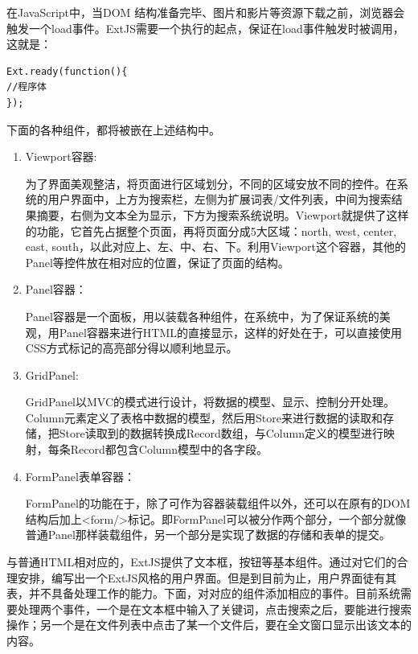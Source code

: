 \documentclass[12pt,a4paper]{article}
\begin{document}
	在{\Times JavaScript}中，当{\Times DOM} 结构准备完毕、图片和影片等资源下载之前，浏览器会触发一个{\Times load}事件。{\Times ExtJS}需要一个执行的起点，保证在{\Times load}事件触发时被调用，这就是：
\lstset{language=C,frame=lines,basicstyle=\Times, commentstyle=\SimSun,texcl=true}
\begin{lstlisting}
Ext.ready(function(){
//程序体
});
\end{lstlisting}	

	下面的各种组件，都将被嵌在上述结构中。
\begin{enumerate}[(1)]
\item
{\Times Viewport}容器:

	为了界面美观整洁，将页面进行区域划分，不同的区域安放不同的控件。在系统的用户界面中，上方为搜索栏，左侧为扩展词表/文件列表，中间为搜索结果摘要，右侧为文本全为显示，下方为搜索系统说明。{\Times Viewport}就提供了这样的功能，它首先占据整个页面，再将页面分成5大区域：{\Times north}, {\Times west}, {\Times center}, {\Times east}, {\Times south}，以此对应上、左、中、右、下。利用{\Times Viewport}这个容器，其他的{\Times Panel}等控件放在相对应的位置，保证了页面的结构。
	
\item
{\Times Panel}容器：

	{\Times Panel}容器是一个面板，用以装载各种组件，在系统中，为了保证系统的美观，用{\Times Panel}容器来进行{\Times HTML}的直接显示，这样的好处在于，可以直接使用{\Times CSS}方式标记的高亮部分得以顺利地显示。
	
\item 
{\Times GridPanel}:

	{\Times GridPanel}以{\Times MVC}的模式进行设计，将数据的模型、显示、控制分开处理。{\Times Column}元素定义了表格中数据的模型，然后用{\Times Store}来进行数据的读取和存储，把{\Times Store}读取到的数据转换成{\Times Record}数组，与{\Times Column}定义的模型进行映射，每条{\Times Record}都包含{\Times Column}模型中的各字段。

\item
{\Times FormPanel}表单容器：

	{\Times FormPanel}的功能在于，除了可作为容器装载组件以外，还可以在原有的{\Times DOM}结构后加上{\Times <form/>}标记。即{\Times FormPanel}可以被分作两个部分，一个部分就像普通{\Times Panel}那样装载组件，另一个部分是实现了数据的存储和表单的提交。
	
\end{enumerate}

	与普通{\Times HTML}相对应的，{\Times ExtJS}提供了文本框，按钮等基本组件。通过对它们的合理安排，编写出一个{\Times ExtJS}风格的用户界面。但是到目前为止，用户界面徒有其表，并不具备处理工作的能力。下面，对对应的组件添加相应的事件。目前系统需要处理两个事件，一个是在文本框中输入了关键词，点击搜索之后，要能进行搜索操作；另一个是在文件列表中点击了某一个文件后，要在全文窗口显示出该文本的内容。
	
\end{document}
